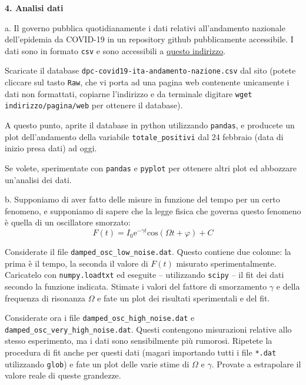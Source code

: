 \documentclass[addpoints]{exam}
\newenvironment{palatino}{\fontfamily{ppl}\selectfont}{\par}
\begin{document}
\begin{palatino}
\hphantom{ciao}

\textbf{4. Analisi dati} \\

\hphantom{ciao}

a. \quad Il governo pubblica quotidianamente i dati relativi all'andamento nazionale dell'epidemia da COVID-19 in un repository github pubblicamente accessibile. I dati sono in formato \texttt{csv} e sono accessibili a \href{https://github.com/pcm-dpc/COVID-19/blob/master/dati-andamento-nazionale/dpc-covid19-ita-andamento-nazionale.csv}{questo indirizzo}. 

Scaricate il database \texttt{dpc-covid19-ita-andamento-nazione.csv} dal sito (potete cliccare sul tasto \texttt{Raw}, che vi porta ad una pagina web contenente unicamente i dati non formattati, copiarne l'indirizzo e da terminale digitare \texttt{wget indirizzo/pagina/web} per ottenere il database).

A questo punto, aprite il database in python utilizzando \texttt{pandas}, e producete un plot dell'andamento della variabile \texttt{totale\_positivi} dal 24 febbraio (data di inizio presa dati) ad oggi. 

Se volete, sperimentate con \texttt{pandas} e \texttt{pyplot} per ottenere altri plot ed abbozzare un'analisi dei dati.

\hphantom{ciao}

b. Supponiamo di aver fatto delle misure in funzione del tempo per un certo fenomeno, e supponiamo di sapere che la legge fisica che governa questo fenomeno è quella di un oscillatore smorzato:
\begin{equation*}
	F(t)=I_0 \mathrm{e}^{-\gamma t} \mathrm{cos}(\Omega t +\varphi)+ C
\end{equation*}

Considerate il file \texttt{damped\_osc\_low\_noise.dat}. Questo contiene due colonne: la prima è il tempo, la seconda il valore di $F(t)$ misurato sperimentalmente. Caricatelo con \texttt{numpy.loadtxt} ed eseguite -- utilizzando \texttt{scipy} -- il fit dei dati secondo la funzione indicata. Stimate i valori del fattore di smorzamento $\gamma$ e della frequenza di risonanza $\Omega$ e fate un plot dei risultati sperimentali e del fit.

Considerate ora i file \texttt{damped\_osc\_high\_noise.dat} e \texttt{damped\_osc\_very\_high\_noise.dat}. Questi contengono misurazioni relative allo stesso esperimento, ma i dati sono sensibilmente più rumorosi. Ripetete la procedura di fit anche per questi dati (magari importando tutti i file \texttt{*.dat} utilizzando \texttt{glob}) e fate un plot delle varie stime di $\Omega$ e $\gamma$. Provate a estrapolare il valore reale di queste grandezze.


\end{palatino}
\end{document}
